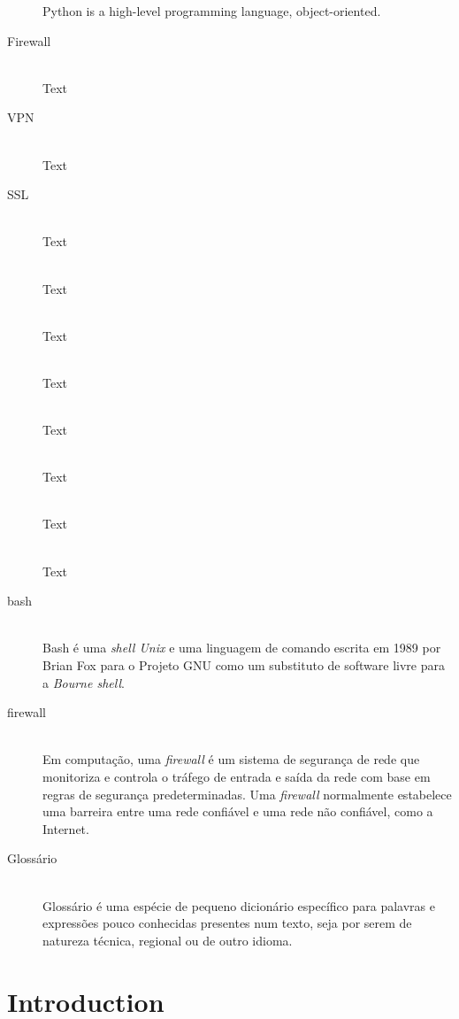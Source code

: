 \documentclass[11pt,a4paper]{report}
\begin{document}
\begin{description}
        Python is a high-level programming language, object-oriented.
    \item[Firewall] \hfill \\
        Text
    \item[VPN] \hfill \\
        Text
    \item[SSL] \hfill \\
        Text
    \item[] \hfill \\
        Text
    \item[] \hfill \\
        Text
    \item[] \hfill \\
        Text
    \item[] \hfill \\
        Text
    \item[] \hfill \\
        Text
    \item[] \hfill \\
        Text
    \item[] \hfill \\
        Text

\item[bash] \hfill \\
  Bash é uma \emph{shell Unix} e uma linguagem de comando escrita
  em 1989 por Brian Fox para o Projeto GNU como um substituto de
  software livre para a \emph{Bourne shell}.
\item[firewall] \hfill \\
  Em computação, uma \emph{firewall} é um sistema de segurança de rede
  que monitoriza e controla o tráfego de entrada e saída da rede
  com base em regras de segurança predeterminadas.
  Uma \emph{firewall} normalmente estabelece uma barreira entre uma
  rede confiável e uma rede não confiável, como a Internet.
\item[Glossário] \hfill \\
  Glossário é uma espécie de pequeno dicionário específico para
  palavras e expressões pouco conhecidas presentes num texto, seja
  por serem de natureza técnica, regional ou de outro idioma.
\end{description}

\chapter{Introduction}
\pagestyle{fancy}
\setcounter{page}{1}
\end{document}
